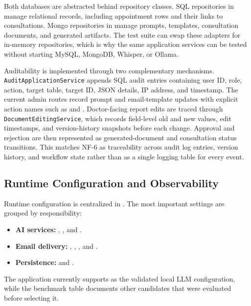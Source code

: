 Both databases are abstracted behind repository classes. SQL repositories in  manage relational records, including appointment rows and their links to consultations. Mongo repositories in  manage prompts, templates, consultation documents, and generated artifacts. The test suite can swap these adapters for in-memory repositories, which is why the same application services can be tested without starting MySQL, MongoDB, Whisper, or Ollama.

Auditability is implemented through two complementary mechanisms. \texttt{AuditApplicationService} appends SQL audit entries containing user ID, role, action, target table, target ID, JSON details, IP address, and timestamp. The current admin routes record prompt and email-template updates with explicit action names such as  and . Doctor-facing report edits are traced through \texttt{DocumentEditingService}, which records field-level old and new values, edit timestamps, and version-history snapshots before each change. Approval and rejection are then represented as generated-document and consultation status transitions. This matches NF-6 as traceability across audit log entries, version history, and workflow state rather than as a single logging table for every event.

\subsection{Runtime Configuration and Observability}
\label{subsec:runtime-configuration-observability}

Runtime configuration is centralized in . The most important settings are grouped by responsibility:

\begin{itemize}
  \item \textbf{AI services:} , , and .
  \item \textbf{Email delivery:} , , , and .
  \item \textbf{Persistence:}  and .
\end{itemize}

The application currently supports  as the validated local LLM configuration, while the benchmark table documents other candidates that were evaluated before selecting it.

